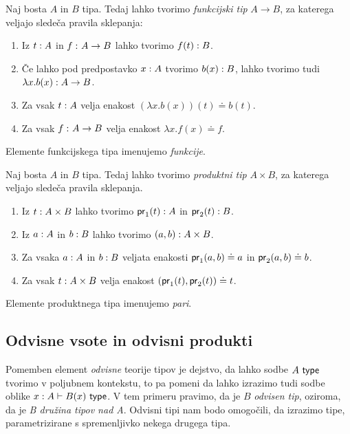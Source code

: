 \begin{definicija}
  Naj bosta \(A\) in \(B\) tipa. Tedaj lahko tvorimo \emph{funkcijski tip} \(A \to B\),
  za katerega veljajo sledeča pravila sklepanja:
  \begin{enumerate}
  \item Iz \(t : A\) in \(f \,\colon A \to B\) lahko tvorimo
    \(f(t) : B\).
  \item Če lahko pod predpostavko \(x : A\) tvorimo
    \(b(x) : B\), lahko tvorimo tudi \({\lambda x.b(x) : A \to B}\).
  \item Za vsak \(t : A\) velja enakost \((\lambda x.b(x))(t) \doteq b(t)\).
  \item Za vsak \(f \,\colon A \to B\) velja enakost \(\lambda x.f(x) \doteq f\).
  \end{enumerate}
  Elemente funkcijskega tipa imenujemo \emph{funkcije}.
\end{definicija}
\begin{definicija}
  Naj bosta \(A\) in \(B\) tipa. Tedaj lahko tvorimo \emph{produktni tip} \(A \times B\),
  za katerega veljajo sledeča pravila sklepanja.
  \begin{enumerate}
  \item Iz \(t : A \times B\) lahko tvorimo \(\textnormal{\textsf{pr}}_{1}(t) : A\) in
    \(\textnormal{\textsf{pr}}_{2}(t) : B\).
  \item Iz \(a : A\) in \(b : B\) lahko tvorimo
    \((a, b) : A \times B\).
  \item Za vsaka \(a : A\) in \(b : B\) veljata enakosti
    \(\textnormal{\textsf{pr}}_{1}(a, b) \doteq a\) in \(\textnormal{\textsf{pr}}_{2}(a, b) \doteq b\).
  \item Za vsak \(t : A \times B\) velja enakost
    \((\textnormal{\textsf{pr}}_{1}(t), \textnormal{\textsf{pr}}_{2}(t)) \doteq t\).
  \end{enumerate}
  Elemente produktnega tipa imenujemo \emph{pari}.
\end{definicija}

\subsection{Odvisne vsote in odvisni produkti}
Pomemben element \emph{odvisne} teorije tipov je dejstvo, da lahko sodbe \(A\ \textnormal{\textsf{type}}\)
tvorimo v poljubnem kontekstu, to pa pomeni da lahko izrazimo tudi sodbe
oblike \(x : A \vdash B(x)\ \textnormal{\textsf{type}}\).
V tem primeru pravimo, da je \(B\) \emph{odvisen tip},
oziroma, da je \emph{B družina tipov nad A}. Odvisni tipi nam bodo omogočili, da izrazimo
tipe, parametrizirane s spremenljivko nekega drugega tipa.

